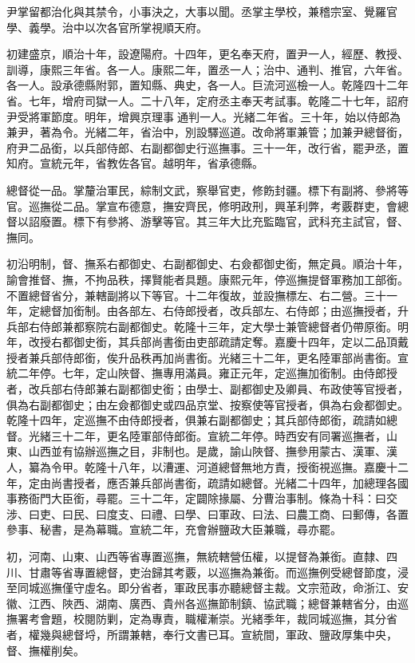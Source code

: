 \begin{pinyinscope}
尹掌留都治化與其禁令，小事決之，大事以聞。丞掌主學校，兼稽宗室、覺羅官學、義學。治中以次各官所掌視順天府。

初建盛京，順治十年，設遼陽府。十四年，更名奉天府，置尹一人，經歷、教授、訓導，康熙三年省。各一人。康熙二年，置丞一人；治中、通判、推官，六年省。各一人。設承德縣附郭，置知縣、典史，各一人。巨流河巡檢一人。乾隆四十二年省。七年，增府司獄一人。二十八年，定府丞主奉天考試事。乾隆二十七年，詔府尹受將軍節度。明年，增興京理事通判一人。光緒二年省。三十年，始以侍郎為兼尹，著為令。光緒二年，省治中，別設驛巡道。改命將軍兼管；加兼尹總督銜，府尹二品銜，以兵部侍郎、右副都御史行巡撫事。三十一年，改行省，罷尹丞，置知府。宣統元年，省教佐各官。越明年，省承德縣。

總督從一品。掌釐治軍民，綜制文武，察舉官吏，修飭封疆。標下有副將、參將等官。巡撫從二品。掌宣布德意，撫安齊民，修明政刑，興革利弊，考覈群吏，會總督以詔廢置。標下有參將、游擊等官。其三年大比充監臨官，武科充主試官，督、撫同。

初沿明制，督、撫系右都御史、右副都御史、右僉都御史銜，無定員。順治十年，諭會推督、撫，不拘品秩，擇賢能者具題。康熙元年，停巡撫提督軍務加工部銜。不置總督省分，兼轄副將以下等官。十二年復故，並設撫標左、右二營。三十一年，定總督加銜制。由各部左、右侍郎授者，改兵部左、右侍郎；由巡撫授者，升兵部右侍郎兼都察院右副都御史。乾隆十三年，定大學士兼管總督者仍帶原銜。明年，改授右都御史銜，其兵部尚書銜由吏部疏請定奪。嘉慶十四年，定以二品頂戴授者兼兵部侍郎銜，俟升品秩再加尚書銜。光緒三十二年，更名陸軍部尚書銜。宣統二年停。七年，定山陜督、撫專用滿員。雍正元年，定巡撫加銜制。由侍郎授者，改兵部右侍郎兼右副都御史銜；由學士、副都御史及卿員、布政使等官授者，俱為右副都御史；由左僉都御史或四品京堂、按察使等官授者，俱為右僉都御史。乾隆十四年，定巡撫不由侍郎授者，俱兼右副都御史；其兵部侍郎銜，疏請如總督。光緒三十二年，更名陸軍部侍郎銜。宣統二年停。時西安有同署巡撫者，山東、山西並有協辦巡撫之目，非制也。是歲，諭山陜督、撫參用蒙古、漢軍、漢人，纂為令甲。乾隆十八年，以漕運、河道總督無地方責，授銜視巡撫。嘉慶十二年，定由尚書授者，應否兼兵部尚書銜，疏請如總督。光緒二十四年，加總理各國事務衙門大臣銜，尋罷。三十二年，定闢除掾屬、分曹治事制。條為十科：曰交涉、曰吏、曰民、曰度支、曰禮、曰學、曰軍政、曰法、曰農工商、曰郵傳，各置參事、秘書，是為幕職。宣統二年，充會辦鹽政大臣兼職，尋亦罷。

初，河南、山東、山西等省專置巡撫，無統轄營伍權，以提督為兼銜。直隸、四川、甘肅等省專置總督，吏治歸其考覈，以巡撫為兼銜。而巡撫例受總督節度，浸至同城巡撫僅守虛名。即分省者，軍政民事亦聽總督主裁。文宗蒞政，命浙江、安徽、江西、陜西、湖南、廣西、貴州各巡撫節制鎮、協武職；總督兼轄省分，由巡撫署考會題，校閱防剿，定為專責，職權漸崇。光緒季年，裁同城巡撫，其分省者，權幾與總督埒，所謂兼轄，奉行文書已耳。宣統間，軍政、鹽政厚集中央，督、撫權削矣。


\end{pinyinscope}
